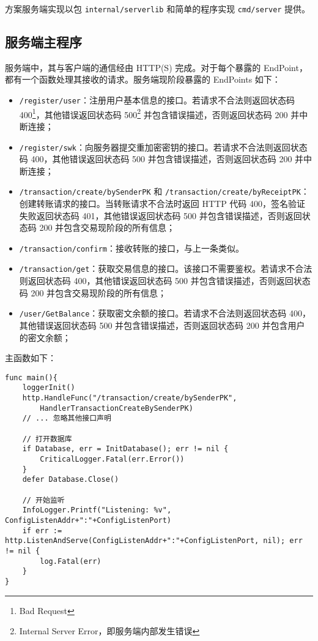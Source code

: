 方案服务端实现以包 \verb|internal/serverlib| 和简单的程序实现 \verb|cmd/server| 提供。

\subsection{服务端主程序}

服务端中，其与客户端的通信经由 HTTP(S) 完成。对于每个暴露的 EndPoint，都有一个函数处理其接收的请求。服务端现阶段暴露的 EndPoints 如下：

\begin{itemize}
    \item \verb|/register/user|：注册用户基本信息的接口。若请求不合法则返回状态码 400\footnote{Bad Request}，其他错误返回状态码 500\footnote{Internal Server Error，即服务端内部发生错误} 并包含错误描述，否则返回状态码 200 并中断连接；
    \item \verb|/register/swk|：向服务器提交重加密密钥的接口。若请求不合法则返回状态码 400，其他错误返回状态码 500 并包含错误描述，否则返回状态码 200 并中断连接；
    \item \verb|/transaction/create/bySenderPK| 和 \verb|/transaction/create/byReceiptPK|：创建转账请求的接口。当转账请求不合法时返回 HTTP 代码 400，签名验证失败返回状态码 401，其他错误返回状态码 500 并包含错误描述，否则返回状态码 200 并包含交易现阶段的所有信息；
    \item \verb|/transaction/confirm|：接收转账的接口，与上一条类似。
    \item \verb|/transaction/get|：获取交易信息的接口。该接口不需要鉴权。若请求不合法则返回状态码 400，其他错误返回状态码 500 并包含错误描述，否则返回状态码 200 并包含交易现阶段的所有信息；
    \item \verb|/user/GetBalance|：获取密文余额的接口。若请求不合法则返回状态码 400，其他错误返回状态码 500 并包含错误描述，否则返回状态码 200 并包含用户的密文余额；
\end{itemize}

主函数如下：

\begin{verbatim}
func main(){
    loggerInit()
    http.HandleFunc("/transaction/create/bySenderPK", 
        HandlerTransactionCreateBySenderPK)
    // ... 忽略其他接口声明
    
    // 打开数据库
    if Database, err = InitDatabase(); err != nil {
        CriticalLogger.Fatal(err.Error())
    }
    defer Database.Close()

    // 开始监听
    InfoLogger.Printf("Listening: %v", ConfigListenAddr+":"+ConfigListenPort)
    if err := http.ListenAndServe(ConfigListenAddr+":"+ConfigListenPort, nil); err != nil {
        log.Fatal(err)
    }
}
\end{verbatim}

